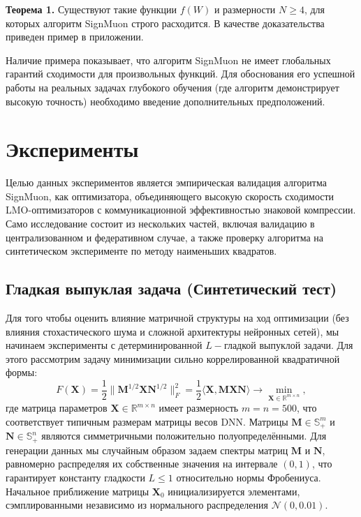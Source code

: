 \documentclass{article}
\begin{document}
\textbf{Теорема 1.}\label{theorem_1} Существуют такие функции $f(W)$ и размерности $N \geq 4$, для которых алгоритм SignMuon строго расходится. В качестве доказательства приведен пример в приложении.

Наличие примера показывает, что алгоритм SignMuon не имеет глобальных гарантий сходимости для произвольных функций. Для обоснования его успешной работы на реальных задачах глубокого обучения (где алгоритм демонстрирует высокую точность) необходимо введение дополнительных предположений.

\section{Эксперименты}
Целью данных экспериментов является эмпирическая валидация алгоритма SignMuon, как оптимизатора, объединяющего высокую скорость сходимости LMO-оптимизаторов с коммуникационной эффективностью знаковой компрессии. Само исследование состоит из нескольких частей, включая валидацию в централизованном и федеративном случае, а также проверку алгоритма на синтетическом эксперименте по методу наименьших квадратов.

\subsection{Гладкая выпуклая задача (Синтетический тест)}
Для того чтобы оценить влияние матричной структуры на ход оптимизации (без влияния стохастического шума и сложной архитектуры нейронных сетей), мы начинаем эксперименты с детерминированной $L-$гладкой выпуклой задачи. Для этого рассмотрим задачу минимизации сильно коррелированной квадратичной формы:
\begin{equation}
F(\mathbf{X}) = \frac{1}{2} \|\mathbf{M}^{1/2} \mathbf{X} \mathbf{N}^{1/2}\|_F^2 = \frac{1}{2} \langle \mathbf{X}, \mathbf{M} \mathbf{X} \mathbf{N} \rangle \to \min_{\mathbf{X} \in \mathbb{R}^{m \times n}},
\label{eq:synthetic_problem}
\end{equation}
где матрица параметров $\mathbf{X} \in \mathbb{R}^{m \times n}$ имеет размерность $m = n = 500$, что соответствует типичным размерам матрицы весов DNN. Матрицы $\mathbf{M} \in \mathbb{S}_+^m$ и $\mathbf{N} \in \mathbb{S}_+^n$ являются симметричными положительно полуопределёнными. Для генерации данных мы случайным образом задаем спектры матриц $\mathbf{M}$ и $\mathbf{N}$, равномерно распределяя их собственные значения на интервале $(0, 1)$, что гарантирует константу гладкости $L \le 1$ относительно нормы Фробениуса. Начальное приближение матрицы $\mathbf{X}_0$ инициализируется элементами, сэмплированными независимо из нормального распределения $\mathcal{N}(0, 0.01)$.
\end{document}
